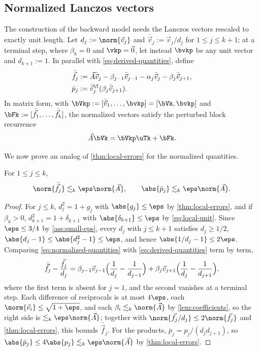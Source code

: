 \subsection{Normalized Lanczos vectors}
\label{sec:normalized}

The construction of the backward model needs the Lanczos vectors rescaled to exactly unit length.
Let \(d_j:=\norm{\vec v_j}\) and \(\bar{\vec v}_j:=\vec v_j/d_j\) for \(1\le j\le k+1\); at a terminal step, where \(\beta_k=0\) and \(\vkp=\vec0\), let instead \(\bvkp\) be any unit vector and \(d_{k+1}:=1\).
In parallel with \cref{eq:derived-quantities}, define
\begin{equation}
  \begin{aligned}
     \bar{\vec f}_j&:=\vec A\bar{\vec v}_j-\beta_{j-1}\bar{\vec v}_{j-1}-\alpha_j\bar{\vec v}_j-\beta_j\bar{\vec v}_{j+1},
 \\
 \bar p_j&:=\bar{\vec v}_j^\T(\beta_j\bar{\vec v}_{j+1}).
  \end{aligned}
 \label{eq:normalized-quantities}
\end{equation}
In matrix form, with \(\bVkp:=[\bar{\vec v}_1,\ldots,\bvkp]=[\bVk,\bvkp]\) and \(\bFk:=[\bar{\vec f}_1,\ldots,\bar{\vec f}_k]\), the normalized vectors satisfy the perturbed block recurrence
\begin{equation}
 \vec A\bVk=\bVkp\uTk+\bFk.
 \label{eq:normalized-interface}
\end{equation}

We now prove an analog of \cref{thm:local-errors} for the normalized quantities.
\begin{lemma}
\label{lem:normalized-errors}
For \(1\le j\le k\),
\[
 \norm{\bar{\vec f}_j}\lesssim_k\eps\norm{\vec A},
 \qquad
 \abs{\bar p_j}\lesssim_k\eps\norm{\vec A}.
\]
\end{lemma}

\begin{proof}
For \(j\le k\), \(d_j^2=1+g_j\) with \(\abs{g_j}\le\eps\) by \cref{thm:local-errors}, and if \(\beta_k>0\), \(d_{k+1}^2=1+\delta_{k+1}\) with \(\abs{\delta_{k+1}}\le\eps\) by \cref{eq:local-unit}.
Since \(\eps\le3/4\) by \cref{ass:small-eps}, every \(d_j\) with \(j\le k+1\) satisfies \(d_j\ge1/2\), \(\abs{d_j-1}\le\abs{d_j^2-1}\le\eps\), and hence \(\abs{1/d_j-1}\le2\eps\).
Comparing \cref{eq:normalized-quantities} with \cref{eq:derived-quantities} term by term,
\[
 \bar{\vec f}_j-\frac{\vec f_j}{d_j}
 =\beta_{j-1}\vec v_{j-1}\Bigl(\frac1{d_j}-\frac1{d_{j-1}}\Bigr)
 +\beta_j\vec v_{j+1}\Bigl(\frac1{d_j}-\frac1{d_{j+1}}\Bigr),
\]
where the first term is absent for \(j=1\), and the second vanishes at a terminal step.
Each difference of reciprocals is at most \(4\eps\), each \(\norm{\vec v_i}\le\sqrt{1+\eps}\), and each \(\beta_i\lesssim_k\norm{\vec A}\) by \cref{lem:coefficients}, so the right side is \(\lesssim_k\eps\norm{\vec A}\); together with \(\norm{\vec f_j/d_j}\le2\norm{\vec f_j}\) and \cref{thm:local-errors}, this bounds \(\bar{\vec f}_j\).
For the products, \(\bar p_j=p_j/(d_jd_{j+1})\), so \(\abs{\bar p_j}\le4\abs{p_j}\lesssim_k\eps\norm{\vec A}\) by \cref{thm:local-errors}.
\end{proof}

